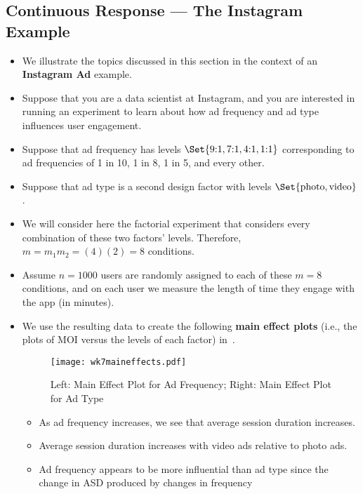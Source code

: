 \subsection{Continuous Response --- The Instagram Example}
\begin{itemize}
      \item We illustrate the topics discussed in this section in the context of an \textbf{Instagram Ad} example.
      \item Suppose that you are a data scientist at Instagram, and you are interested in running an experiment
            to learn about how ad frequency and ad type influences user engagement.
      \item Suppose that ad frequency has levels $ \Set{\text{9:1},\text{7:1},\text{4:1},\text{1:1}} $ corresponding to ad frequencies of
            1 in 10, 1 in 8, 1 in 5, and every other.
      \item Suppose that ad type is a second design factor with levels $ \Set{\text{photo},\text{video}} $.
      \item We will consider here the factorial experiment that considers every combination of these two factors'
            levels. Therefore, $ m=m_1m_2=(4)(2)=8 $ conditions.
      \item Assume $ n=1000 $ users are randomly assigned to each of these $ m=8 $ conditions, and on each user we measure
            the length of time they engage with the app (in minutes).
      \item We use the resulting data to create the following \textbf{main effect plots} (i.e., the plots of MOI versus
            the levels of each factor) in~.
            \begin{figure}[!htbp]
                  \centering
                  \texttt{[image: wk7maineffects.pdf]}
                  \caption{Left: Main Effect Plot for Ad Frequency; Right: Main Effect Plot for Ad Type}\label{wk7eff}
            \end{figure}
            \begin{itemize}
                  \item As ad frequency increases, we see that average session duration increases.
                  \item Average session duration increases with video ads relative to photo ads.
                  \item Ad frequency appears to be more influential than ad type since the change in ASD produced by changes in frequency

\end{itemize}
\end{itemize}
